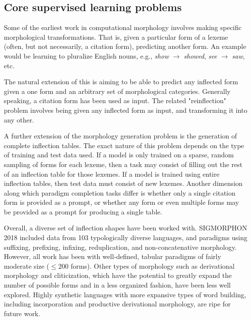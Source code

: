 \subsection{Core supervised learning problems}

Some of the earliest work in computational morphology involves making specific morphological transformations. That is, given a particular form of a lexeme (often, but not necessarily, a citation form), predicting another form. An example would be learning to pluralize English nouns, e.g., \textit{show} $\rightarrow$ \textit{showed}, \textit{see} $\rightarrow$ \textit{saw}, etc. \parencite{Dreyer2008}

The natural extension of this is aiming to be able to predict any inflected form given a one form and an arbitrary set of morphological categories. Generally speaking, a citation form has been used as input. \parencite{Durrett2013} \parencite{Faruqui2015} \parencite{Cotterell2017} The related "reinflection" problem involves being given any inflected form as input, and transforming it into any other. \parencite{Cotterell2016}

A further extension of the morphology generation problem is the generation of complete inflection tables. The exact nature of this problem depends on the type of training and test data used. If a model is only trained on a sparse, random sampling of forms for each lexeme, then a task may consist of filling out the rest of an inflection table for those lexemes. If a model is trained using entire inflection tables, then test data must consist of new lexemes. Another dimension along which paradigm completion tasks differ is whether only a single citation form is provided as a prompt, or whether any form or even multiple forms may be provided as a prompt for producing a single table. \parencite{Hulden2014} \parencite{Ahlberg2015} \parencite{Cotterell2017} 

Overall, a diverse set of inflection shapes have been worked with. SIGMORPHON 2018 included data from 103 typologically diverse languages, and paradigms using suffixing, prefixing, infixing, reduplication, and non-concatenative morphology. However, all work has been with well-defined, tabular paradigms of fairly moderate size ($\leq 200$ forms). \parencite{Cotterell2018b} Other types of morphology such as derivational morphology and cliticization, which have the potential to greatly expand the number of possible forms and in a less organized fashion, have been less well explored. Highly synthetic languages with more expansive types of word building, including incorporation and productive derivational morphology, are ripe for future work. \parencite{Cotterell2016} 

